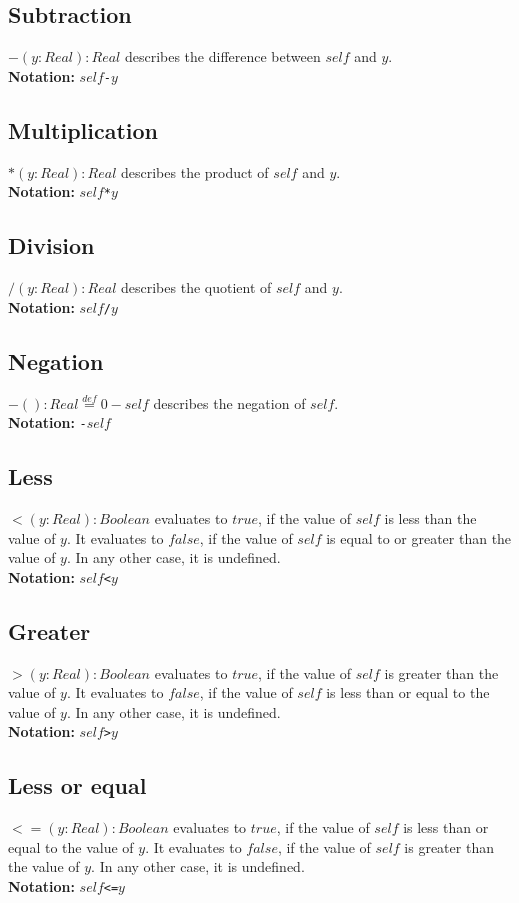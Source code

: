 \subsection{Subtraction}
$-(y:\mathit{Real}):\mathit{Real}$ describes the difference between
$\mathit{self}$
  and $y$.\\
  {\bf Notation:} $\mathit{self}$\verb+-+$y$
\subsection{Multiplication}
$*(y:\mathit{Real}):\mathit{Real}$ describes the product of $\mathit{self}$ and
$y$.\\
{\bf Notation:} $\mathit{self}$\verb+*+$y$
\subsection{Division}
$/(y:\mathit{Real}):\mathit{Real}$ describes the quotient of $\mathit{self}$
and $y$.\\
{\bf Notation:} $\mathit{self}$\verb+/+$y$
\subsection{Negation}
$-():\mathit{Real}\stackrel{def}{=} 0-\mathit{self}$ describes the negation
of $\mathit{self}$.\\
{\bf Notation:} \verb+-+$\mathit{self}$
\subsection{Less}
$<(y:\mathit{Real}):\mathit{Boolean}$ evaluates to $\mathit{true}$,
if the value of
  $\mathit{self}$ is less than the value of $y$.  It evaluates to $\mathit{false}$, if
  the value of $\mathit{self}$ is equal to or greater than the value of $y$.
  In any other case, it is undefined.\\
  {\bf Notation:} $\mathit{self}$\verb+<+$y$
\subsection{Greater}
$>(y:\mathit{Real}):\mathit{Boolean}$ evaluates to $\mathit{true}$, if the value
of
  $\mathit{self}$ is greater than the value of $y$.  It evaluates to $\mathit{false}$,
  if the value of $\mathit{self}$ is less than or equal to the value of $y$.
  In any other case, it is undefined.\\
  {\bf Notation:} $\mathit{self}$\verb+>+$y$
\subsection{Less or equal}
$<=(y:\mathit{Real}):\mathit{Boolean}$ evaluates to $\mathit{true}$, if the
value of
  $\mathit{self}$ is less than or equal to the value of $y$.  It evaluates to
  $\mathit{false}$, if the value of $\mathit{self}$ is greater than the value of $y$.  In
  any other case, it is undefined.\\
  {\bf Notation:} $\mathit{self}$\verb+<=+$y$
